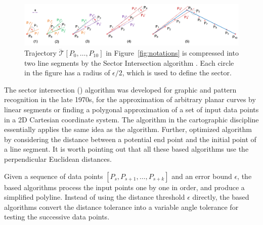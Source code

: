 \begin{figure}[tb!]
	\centering
	\includegraphics[scale=0.78]{figures/Fig-sleeve.png}
	\caption{\small Trajectory $\dddot{\mathcal{T}}[P_0, \ldots, P_{10}]$ in Figure~\ref{fig:notations} is compressed into two line segments by the Sector Intersection algorithm  \cite{Williams:Longest, Sklansky:Cone}. Each circle in the figure has a radius of $\epsilon/2$, which is used to define the sector. }
	\vspace{-1ex}
	\label{fig:sleeve}
\end{figure}



The sector intersection (\cia) algorithm \cite{Williams:Longest, Sklansky:Cone} was developed for graphic and pattern recognition in the late 1970s, for the approximation of arbitrary planar curves by linear segments or finding a polygonal approximation of a set of input data points in a 2D Cartesian coordinate system. The \sleeve algorithm \cite{Zhao:Sleeve} in the cartographic discipline essentially applies the same idea as the \cia algorithm.
Further, \cite{Dunham:Cone}  optimized algorithm \cia by considering the distance between a potential end point and the initial point of a line segment. It is worth pointing out that all these \cia based algorithms use the perpendicular Euclidean distances.


Given a sequence of data points $[P_{s}, P_{s+1}, \ldots, P_{s+k}]$ and an error bound $\epsilon$, the \cia based algorithms process the input points one by one in order, and produce a simplified polyline.  Instead of using the distance threshold $\epsilon$ directly, the \cia based algorithms convert the distance tolerance into a variable angle tolerance for testing the successive data points.

